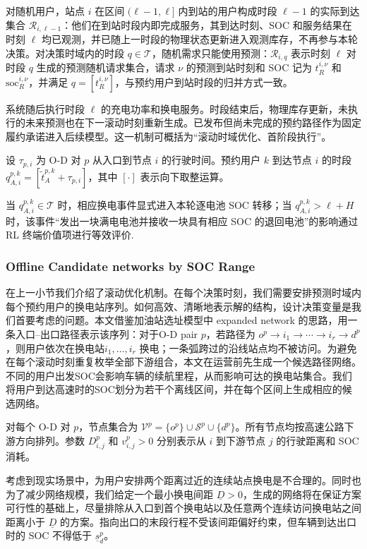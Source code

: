 \documentclass[12pt,a4paper,UTF8]{ctexart}
\begin{document}
对随机用户，站点 $i$ 在区间 $(\ell-1,\ell]$ 内到站的用户构成时段 $\ell-1$ 的实际到达集合 $\mathcal R_{i,\ell-1}$：他们在到站时段内即完成服务，其到达时刻、SOC 和服务结果在时刻 $\ell$ 均已观测，并已随上一时段的物理状态更新进入观测库存，不再参与本轮决策。对决策时域内的时段 $q\in\mathcal T$，随机需求只能使用预测：$\mathcal R_{i,q}$ 表示时刻 $\ell$ 对时段 $q$ 生成的预测随机请求集合，请求 $\nu$ 的预测到站时刻和 SOC 记为 $t_{R}^{i,\nu}$ 和 $\mathrm{soc}_{R}^{i,\nu}$，并满足 $q=[t_{R}^{i,\nu}]$，与预约用户到站时段的归并方式一致。

系统随后执行时段 $\ell$ 的充电功率和换电服务。时段结束后，物理库存更新，未执行的未来预测也在下一滚动时刻重新生成。已发布但尚未完成的预约路径作为固定履约承诺进入后续模型。这一机制可概括为“滚动时域优化、首阶段执行”。

设 $\tau_{p,i}$ 为 O-D 对 $p$ 从入口到节点 $i$ 的行驶时间。预约用户 $k$ 到达节点 $i$ 的时段 $q_{A,i}^{p,k}=[\widetilde t_{A}^{p,k}+\tau_{p,i}]$，其中 $[\cdot]$ 表示向下取整运算。

当 $q_{A,i}^{p,k}\in\mathcal T$ 时，相应换电事件显式进入本轮逐电池 SOC 转移；当 $q_{A,i}^{p,k}>\ell+H$ 时，该事件“发出一块满电电池并接收一块具有相应 SOC 的退回电池”的影响通过 RL 终端价值项进行等效评价.


\subsubsection{Offline Candidate networks by SOC Range}

在上一小节我们介绍了滚动优化机制。在每个决策时刻，我们需要安排预测时域内每个预约用户的换电站序列。如何高效、清晰地表示解的结构，设计决策变量是我们首要考虑的问题。本文借鉴加油站选址模型中 expanded network 的思路，用一条入口--出口路径表示该序列：对于O-D pair $p$，若路径为
$o^p\rightarrow i_1\rightarrow\cdots\rightarrow i_r\rightarrow d^p$，则用户依次在换电站$i_1,\ldots,i_r$ 换电；一条弧跨过的沿线站点均不被访问。为避免在每个滚动时刻重复枚举全部下游组合，本文在运营前先生成一个候选路径网络。不同的用户出发SOC会影响车辆的续航里程，从而影响可达的换电站集合。我们将用户到达高速时的SOC划分为若干个离线区间，并在每个区间上生成相应的候选网络。

对每个 O-D 对 $p$，节点集合为
$\mathcal V^p=\{o^p\}\cup\mathcal S^p\cup\{d^p\}$。所有节点均按高速公路下游方向排列。参数 $D_{i,j}^p$ 和 $v_{i,j}^p>0$ 分别表示从 $i$ 到下游节点 $j$ 的行驶距离和 SOC 消耗。

考虑到现实场景中，为用户安排两个距离过近的连续站点换电是不合理的。同时也为了减少网络规模，我们给定一个最小换电间距 $\underline D>0$，生成的网络将在保证方案可行性的基础上，尽量排除从入口到首个换电站以及任意两个连续访问换电站之间距离小于 $\underline D$ 的方案。指向出口的末段行程不受该间距偏好约束，但车辆到达出口时的 SOC 不得低于 $\underline s_d^p$。
\end{document}
